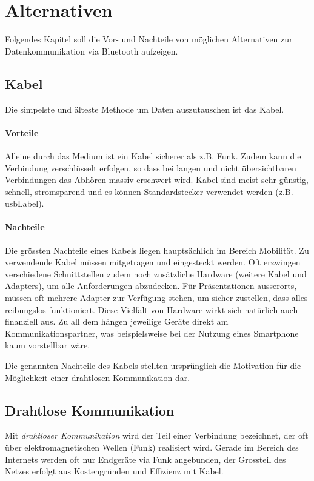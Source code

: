 \chapter{Alternativen}
\label{ch:alt}
Folgendes Kapitel soll die Vor- und Nachteile von möglichen Alternativen zur Datenkommunikation via Bluetooth aufzeigen.

\section{Kabel}
Die simpelste und älteste Methode um Daten auszutauschen ist das Kabel.

\subsubsection{Vorteile}
Alleine durch das Medium ist ein Kabel sicherer als z.B. Funk. Zudem kann die Verbindung verschlüsselt erfolgen, so dass bei langen und nicht übersichtbaren Verbindungen das Abhören massiv erschwert wird.
Kabel sind meist sehr günstig, schnell, stromsparend und es können Standardstecker verwendet werden (z.B. \gls{usbLabel}).

\subsubsection{Nachteile}
Die grössten Nachteile eines Kabels liegen hauptsächlich im Bereich Mobilität.
Zu verwendende Kabel müssen mitgetragen und eingesteckt werden.
Oft erzwingen verschiedene Schnittstellen zudem noch zusätzliche Hardware (weitere Kabel und Adapters), um alle Anforderungen abzudecken.
Für Präsentationen ausserorts, müssen oft mehrere Adapter zur Verfügung stehen, um sicher zustellen, dass alles reibungslos funktioniert.
Diese Vielfalt von Hardware wirkt sich natürlich auch finanziell aus. Zu all dem hängen jeweilige Geräte direkt am Kommunikationspartner, was beispielsweise bei der Nutzung eines Smartphone kaum vorstellbar wäre.

Die genannten Nachteile des Kabels stellten ursprünglich die Motivation für die Möglichkeit einer drahtlosen Kommunikation dar.

\section{Drahtlose Kommunikation}

Mit \textit{drahtloser Kommunikation} wird der Teil einer Verbindung bezeichnet, der oft über elektromagnetischen Wellen (Funk) realisiert wird.
Gerade im Bereich des Internets werden oft nur Endgeräte via Funk angebunden, der Grossteil des Netzes erfolgt aus Kostengründen und Effizienz mit Kabel.

